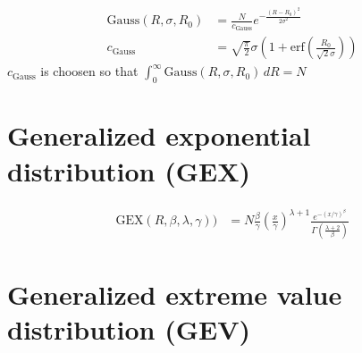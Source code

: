 \begin{subequations}
\begin{align}
\text{Gauss}(R,\sigma,R_0)&= \frac{N}{c_\text{Gauss}}
e^{-\frac{\left(R-R_0\right)^2}{2\sigma^2}} \\
c_\text{Gauss} &=\sqrt{\frac{\pi}{2}}\sigma\left(1 +
\text{erf}\left(\frac{R_0}{\sqrt{2}\sigma}\right) \right)
\end{align}
\end{subequations}
$c_\text{Gauss}$ is choosen so that $\int_0^\infty\!
\text{Gauss}(R,\sigma,R_0)\,dR = N$


\clearpage
\section{Generalized exponential distribution (GEX)}

\begin{subequations}
\begin{align}
\text{GEX}(R,\beta,\lambda,\gamma))&= N
\frac{\beta}{\gamma}\left(\frac{x}{\gamma}\right)^{\lambda+1}
\frac{e^{-(x/\gamma)^{\beta}}}{\Gamma  \left( {\frac
{\lambda+2}{\beta}} \right)}
\end{align}
\end{subequations}


\clearpage
\section{Generalized extreme value distribution (GEV)}

